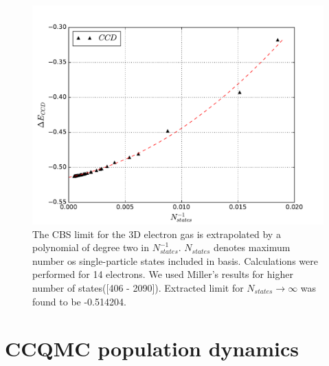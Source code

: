 \documentclass[twoside,english]{uiofysmaster}
\begin{document}
\begin{figure}[ht!]
	\centering
	\includegraphics[width=0.8\linewidth]{cbs}
	\caption{The CBS limit for the 3D electron gas is extrapolated by a polynomial of degree two in $N_{states}^{-1}$. $N_{states}$ denotes maximum number os single-particle states included in basis. Calculations were performed for 14 electrons. We used Miller's\cite{MillerQuantumMechanicalStudies2017} results for higher number of states([406 - 2090]). Extracted limit for $N_{states} \rightarrow \infty$ was found to be -0.514204.}
	\label{fig:CBS}
\end{figure}






\section{CCQMC population dynamics}
\end{document}
